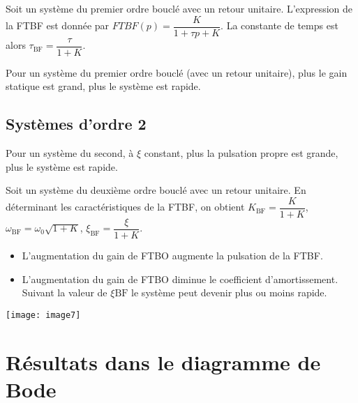 Soit un système du premier ordre bouclé avec un retour unitaire. L'expression de la FTBF est donnée par $FTBF(p)=\dfrac{K}{1+\tau p + K}$. La constante de temps est alors $\tau_{\text{BF}}=\dfrac{\tau}{1+K}$. 

\begin{resultat}
Pour un système du premier ordre bouclé (avec un retour unitaire), plus le gain statique est grand, plus le système est rapide. 
\end{resultat}

\subsection{Systèmes d'ordre 2}

\noindent\begin{minipage}[c]{.5\linewidth}
\begin{resultat}
Pour un système du second, à $\xi$ constant, plus la pulsation propre est grande, plus le système est rapide. 
\end{resultat} 



Soit un système du deuxième ordre bouclé avec un retour unitaire. En déterminant les caractéristiques de la FTBF, on obtient $K_{\text{BF}}=\dfrac{K}{1+K}$, $\omega_{\text{BF}}=\omega_0\sqrt{1+K}$, $\xi_{\text{BF}}=\dfrac{\xi}{1+K}$.


\begin{resultat}
\begin{itemize}
\item L'augmentation du gain de FTBO augmente la pulsation de la FTBF. 
\item L'augmentation du gain de FTBO diminue le coefficient d'amortissement. Suivant la valeur de $\xi{\text{BF}}$ le système peut devenir plus ou moins rapide.  
\end{itemize}
\end{resultat}

\end{minipage}\hfill
\begin{minipage}[c]{.47\linewidth}
\begin{center}
\texttt{[image: image7]}
\end{center}
\end{minipage}

\section{Résultats dans le diagramme de Bode}


